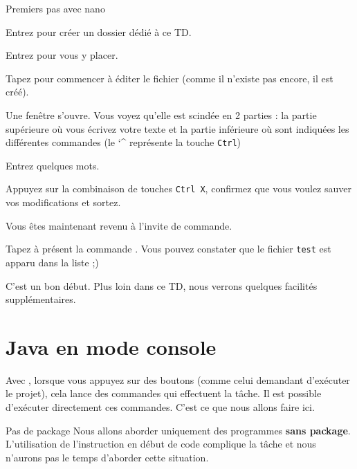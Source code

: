\documentclass[a4paper,11pt]{style-esi/td}
\begin{document}
	\begin{Tutoriel}{Premiers pas avec nano}
	\vspace{-1em}
	\begin{steps}
	\item 
		Entrez  pour créer un dossier dédié à ce TD.
	\item 
		Entrez  pour vous y placer.
	\item 
		Tapez  pour commencer à éditer le fichier  
		(comme il n'existe pas encore, il est créé).
	
		Une fenêtre s'ouvre. 
		Vous voyez qu'elle est scindée en 2 parties : 
		la partie supérieure où vous écrivez votre texte 
		et la partie inférieure où sont indiquées 
		les différentes commandes (le \char`\^{} représente la touche \verb|Ctrl|)
	\item 
		Entrez quelques mots.
	\item 
		Appuyez sur la combinaison de touches \verb|Ctrl X|, 
		confirmez que vous voulez sauver vos modifications et sortez.
	
		Vous êtes maintenant revenu à l'invite de commande.
	\item 
		Tapez à présent la commande .
		Vous pouvez constater que le fichier \verb_test_ est apparu dans la liste ;)
	\end{steps}
	\end{Tutoriel}

	C'est un bon début.
	Plus loin dans ce TD, nous verrons quelques facilités supplémentaires.

\section{Java en mode console}

	Avec , lorsque vous appuyez sur des boutons
	(comme celui demandant d'exécuter le projet),
	cela lance des commandes qui effectuent la tâche.
	Il est possible d'exécuter directement ces commandes.
	C'est ce que nous allons faire ici.

	\begin{alerttbox}{Pas de package}
		Nous allons aborder uniquement des programmes 
		\textbf{sans package}.
		L'utilisation de l'instruction  en début de code
		complique la tâche et nous n'aurons pas le temps d'aborder cette situation.
	\end{alerttbox}
\end{document}
